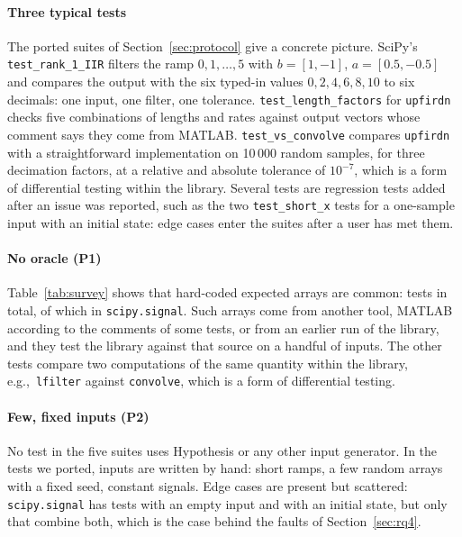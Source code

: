 \documentclass[10pt,conference]{IEEEtran}
\newcommand{\code}[1]{\texttt{#1}}
\newcommand{\eg}{e.g.,\ }
\begin{document}


\paragraph*{Three typical tests} The ported suites of Section~\ref{sec:protocol}
give a concrete picture. SciPy's \code{test\_rank\_1\_IIR} filters the ramp
$0,1,\dots,5$ with $b=[1,-1]$, $a=[0.5,-0.5]$ and compares the output with the six
typed-in values $0,2,4,6,8,10$ to six decimals: one input, one filter, one
tolerance. \code{test\_length\_factors} for \code{upfirdn} checks five
combinations of lengths and rates against output vectors whose comment says they
come from MATLAB. \code{test\_vs\_convolve} compares \code{upfirdn} with a
straightforward implementation on 10\,000 random samples, for three
decimation factors, at a relative and absolute tolerance of $10^{-7}$, which is a
form of differential testing within the library. Several tests are regression
tests added after an issue was reported, such as the two \code{test\_short\_x} tests for a
one-sample input with an initial state: edge cases enter the suites after a user
has met them.


\paragraph*{No oracle (P1)} Table~\ref{tab:survey} shows that hard-coded
expected arrays are common: \surveyHardcodedAll{} tests in total, of which
\surveyScipyHardcoded{} in \code{scipy.signal}. Such arrays come from another
tool, MATLAB according to the comments of some tests, or from an earlier run of
the library, and they test the library against that source on a handful of
inputs. The other tests compare
two computations of the same quantity within the library, \eg \code{lfilter}
against \code{convolve}, which is a form of differential testing.

\paragraph*{Few, fixed inputs (P2)} No test in the five suites uses Hypothesis
or any other input generator. In the tests we ported, inputs are written by
hand: short ramps, a few random arrays with a fixed seed, constant signals. Edge cases are present
but scattered: \code{scipy.signal} has \surveyScipyEmpty{} tests with an empty
input and \surveyScipyZi{} with an initial state, but only \surveyZiEmpty{} that
combine both, which is the case behind the faults of Section~\ref{sec:rq4}.
\end{document}
